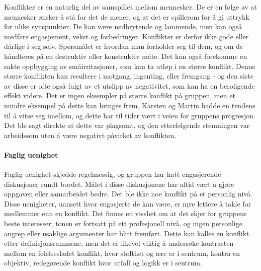Konflikter er en naturlig del av samspillet mellom mennesker. 
De er en følge av at mennesker ønsker å stå for det de mener, og at det er spillerom for å gi uttrykk for ulike synspunkter. De kan være nedbrytende og lammende, men kan også medføre engasjement, vekst og forbedringer.
Konflikter er derfor ikke gode eller dårlige i seg selv.
Spørsmålet er hvordan man forholder seg til dem, og om de håndteres på en destruktiv eller konstruktiv måte\cite{helsekompetanse}. 
Det kan også forekomme en sakte oppbygging av småirritasjoner, som kan ta utløp i en større konflikt.
Denne større konflikten kan resultere i motgang, ingenting, eller fremgang - og den siste av disse er ofte også fulgt av et utslipp av negativitet, som kan ha en beroligende effekt videre. 
Det er ingen eksempler på større konflikt på gruppen, men et mindre eksempel på dette kan bringes frem.
Karsten og Martin hadde en tendens til å vitse seg imellom, og dette har til tider vært i veien for gruppens progresjon.
Det ble sagt direkte at dette var plagsomt, og den etterfølgende stemningen var arbeidssom uten å være negativt påvirket av konflikten.
\\
\paragraph{Faglig uenighet}
Faglig uenighet skjedde regelmessig, og gruppen har hatt engasjerende diskusjoner rundt bordet. 
Målet i disse diskusjonene har altid vært å gjøre oppgaven eller samarbeidet bedre.
Det ble ikke noe konflikt på et personlig nivå. 
Disse uenigheter, uansett hvor engasjerte de kan være, er mye lettere å takle for medlemmer enn en konflikt. 
Det finnes en visshet om at det skjer for gruppens beste interesser; tonen er fortsatt på ett profesjonell nivå, og ingen personlige angrep eller usaklige argumenter har blitt fremført. 
Dette kan kalles en konflikt etter definisjonsrammene, men det er likevel viktig å undersøke kontrasten mellom en følelsesladet konflikt, hvor stolthet og ære er i sentrum, kontra en objektiv, redegørende konflikt hvor utfall og logikk er i sentrum. 
\\
